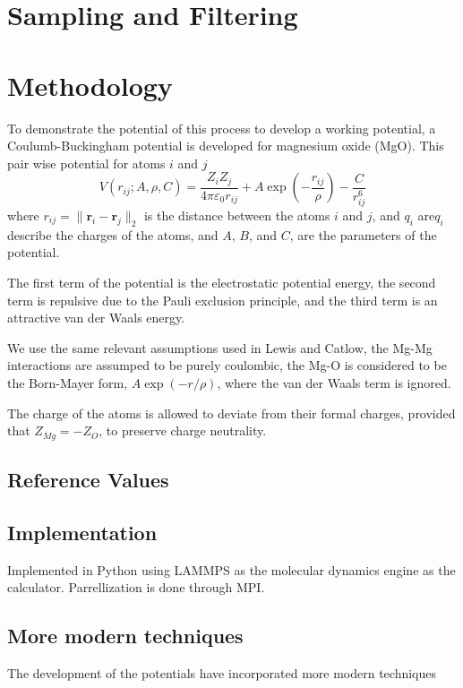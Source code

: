 \section{Sampling and Filtering}
\section{Methodology}
To demonstrate the potential of this process to develop a working potential, a Coulumb-Buckingham potential\cite{lewis1985_pot_buck_oxides} is developed for magnesium oxide (MgO).
This pair wise potential for atoms $i$ and $j$
\begin{equation}
    \label{eq:buck_eq}
    V(r_{ij};A,\rho,C)
        = \frac{Z_i Z_j}{4 \pi \varepsilon_0 r_{ij}}
            + A \exp(-\frac{r_{ij}}{\rho})
            - \frac{C}{r_{ij}^6}
\end{equation}
where $r_{ij} = \lVert \bm{r}_i - \bm{r}_j \rVert_2$ is the distance between the atoms $i$ and $j$, and $q_i$ are$q_i$ describe the charges of the atoms, and $A$, $B$, and $C$, are the parameters of the potential.

The first term of the potential is the electrostatic potential energy, the second term is repulsive due to the Pauli exclusion principle, and the third term is an attractive van der Waals energy.

We use the same relevant assumptions used in Lewis and Catlow\cite{lewis1985_pot_buck_oxides}, the Mg-Mg interactions are assumped to be purely coulombic, the Mg-O is considered to be the Born-Mayer form, $A \exp(-r/\rho)$, where the van der Waals term is ignored.

The charge of the atoms is allowed to deviate from their formal charges, provided that $Z_{Mg} = - Z_{O}$, to preserve charge neutrality.
\subsection{Reference Values}

\subsection{Implementation}
Implemented in Python using LAMMPS as the molecular dynamics engine as the calculator.  Parrellization is done through MPI.

\subsection{More modern techniques}
The development of the potentials have incorporated more modern techniques

